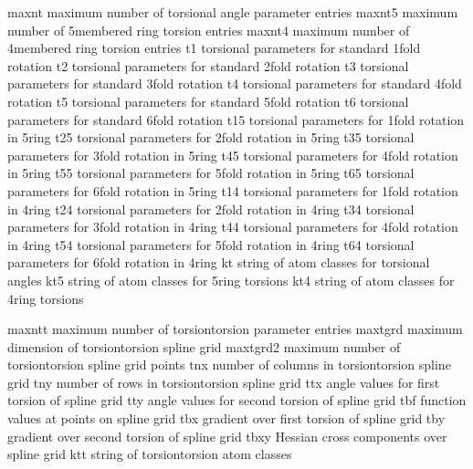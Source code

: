 \documentclass[letterpaper,11pt,english]{sphinxmanual}
\begin{document}
\sphinxAtStartPar
{}

\begin{sphinxVerbatim}[commandchars=\\\{\}]
maxnt           maximum number of torsional angle parameter entries
maxnt5          maximum number of 5\PYGZhy{}membered ring torsion entries
maxnt4          maximum number of 4\PYGZhy{}membered ring torsion entries
t1              torsional parameters for standard 1\PYGZhy{}fold rotation
t2              torsional parameters for standard 2\PYGZhy{}fold rotation
t3              torsional parameters for standard 3\PYGZhy{}fold rotation
t4              torsional parameters for standard 4\PYGZhy{}fold rotation
t5              torsional parameters for standard 5\PYGZhy{}fold rotation
t6              torsional parameters for standard 6\PYGZhy{}fold rotation
t15             torsional parameters for 1\PYGZhy{}fold rotation in 5\PYGZhy{}ring
t25             torsional parameters for 2\PYGZhy{}fold rotation in 5\PYGZhy{}ring
t35             torsional parameters for 3\PYGZhy{}fold rotation in 5\PYGZhy{}ring
t45             torsional parameters for 4\PYGZhy{}fold rotation in 5\PYGZhy{}ring
t55             torsional parameters for 5\PYGZhy{}fold rotation in 5\PYGZhy{}ring
t65             torsional parameters for 6\PYGZhy{}fold rotation in 5\PYGZhy{}ring
t14             torsional parameters for 1\PYGZhy{}fold rotation in 4\PYGZhy{}ring
t24             torsional parameters for 2\PYGZhy{}fold rotation in 4\PYGZhy{}ring
t34             torsional parameters for 3\PYGZhy{}fold rotation in 4\PYGZhy{}ring
t44             torsional parameters for 4\PYGZhy{}fold rotation in 4\PYGZhy{}ring
t54             torsional parameters for 5\PYGZhy{}fold rotation in 4\PYGZhy{}ring
t64             torsional parameters for 6\PYGZhy{}fold rotation in 4\PYGZhy{}ring
kt              string of atom classes for torsional angles
kt5             string of atom classes for 5\PYGZhy{}ring torsions
kt4             string of atom classes for 4\PYGZhy{}ring torsions
\end{sphinxVerbatim}

\sphinxAtStartPar
{}

\begin{sphinxVerbatim}[commandchars=\\\{\}]
maxntt          maximum number of torsion\PYGZhy{}torsion parameter entries
maxtgrd         maximum dimension of torsion\PYGZhy{}torsion spline grid
maxtgrd2        maximum number of torsion\PYGZhy{}torsion spline grid points
tnx             number of columns in torsion\PYGZhy{}torsion spline grid
tny             number of rows in torsion\PYGZhy{}torsion spline grid
ttx             angle values for first torsion of spline grid
tty             angle values for second torsion of spline grid
tbf             function values at points on spline grid
tbx             gradient over first torsion of spline grid
tby             gradient over second torsion of spline grid
tbxy            Hessian cross components over spline grid
ktt             string of torsion\PYGZhy{}torsion atom classes
\end{sphinxVerbatim}
\end{document}

